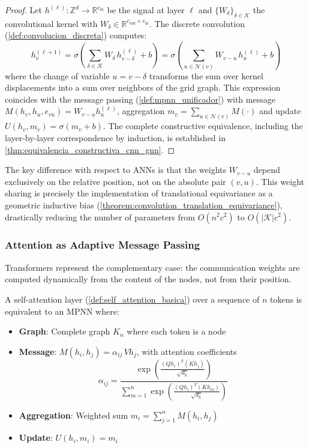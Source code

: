 \begin{proof}
Let $h^{(\ell)}: \mathbb{Z}^d \to \mathbb{R}^{c_{\mathrm{in}}}$ be the signal at layer $\ell$ and $\{W_\delta\}_{\delta \in \mathcal{K}}$ the convolutional kernel with $W_\delta \in \mathbb{R}^{c_{\mathrm{out}} \times c_{\mathrm{in}}}$. The discrete convolution (\autoref{def:convolucion_discreta}) computes:
\[
h_v^{(\ell+1)} = \sigma\!\left(\sum_{\delta \in \mathcal{K}} W_\delta\, h_{v-\delta}^{(\ell)} + b\right) = \sigma\!\left(\sum_{u \in \mathcal{N}(v)} W_{v-u}\, h_u^{(\ell)} + b\right)
\]
where the change of variable $u = v - \delta$ transforms the sum over kernel displacements into a sum over neighbors of the grid graph. This expression coincides with the message passing (\autoref{def:mpnn_unificador}) with message $M(h_v, h_u, e_{vu}) = W_{v-u} h_u^{(\ell)}$, aggregation $m_v = \sum_{u \in \mathcal{N}(v)} M(\cdot)$ and update $U(h_v, m_v) = \sigma(m_v + b)$. The complete constructive equivalence, including the layer-by-layer correspondence by induction, is established in \autoref{thm:equivalencia_constructiva_cnn_gnn}.
\end{proof}

The key difference with respect to \glspl{ANN} is that the weights $W_{v-u}$ depend exclusively on the relative position, not on the absolute pair $(v, u)$. This weight sharing is precisely the implementation of translational equivariance as a geometric inductive bias (\autoref{theorem:convolution_translation_equivariance}), drastically reducing the number of parameters from $O(n^2 c^2)$ to $O(|\mathcal{K}| c^2)$.

\subsubsection{Attention as Adaptive Message Passing}

\glspl{Transformer} represent the complementary case: the communication weights are computed dynamically from the content of the nodes, not from their position.

\begin{proposition}\label{prop:attention_mpnn}
A self-attention layer (\autoref{def:self_attention_basica}) over a sequence of $n$ tokens is equivalent to an \gls{MPNN} where:
\begin{itemize}
    \item \textbf{Graph}: Complete graph $K_n$ where each token is a node
    \item \textbf{Message}: $M(h_i, h_j) = \alpha_{ij}\, V h_j$, with attention coefficients
    \[
    \alpha_{ij} = \frac{\exp\!\left(\frac{(Qh_i)^T(Kh_j)}{\sqrt{d_k}}\right)}{\sum_{m=1}^n \exp\!\left(\frac{(Qh_i)^T(Kh_m)}{\sqrt{d_k}}\right)}
    \]
    \item \textbf{Aggregation}: Weighted sum $m_i = \sum_{j=1}^n M(h_i, h_j)$
    \item \textbf{Update}: $U(h_i, m_i) = m_i$
\end{itemize}
\end{proposition}

